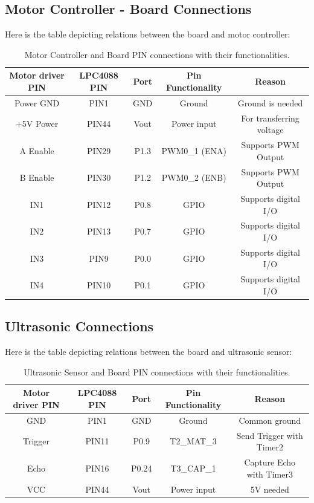 \documentclass[12pt]{article}
\begin{document}
\subsection{Motor Controller - Board Connections}

Here is the table depicting relations between the board and motor controller:

\begin {table}[H]
\begin{center}
\begin{tabular}{|c|c|c|c|c|}
\hline
Motor driver PIN & LPC4088 PIN & Port & Pin Functionality & Reason \\\hline
Power GND & PIN1 & GND & Ground & Ground is needed \\\hline
+5V Power & PIN44 & Vout & Power input & For transferring voltage \\\hline
A Enable & PIN29 & P1.3 & PWM0\_1 (ENA) & Supports PWM Output \\\hline
B Enable & PIN30 & P1.2 & PWM0\_2 (ENB) & Supports PWM Output \\\hline
IN1 & PIN12 & P0.8 & GPIO & Supports digital I/O \\\hline
IN2 & PIN13 & P0.7 & GPIO & Supports digital I/O \\\hline
IN3 & PIN9 & P0.0 & GPIO & Supports digital I/O \\\hline
IN4 & PIN10 & P0.1 & GPIO & Supports digital I/O \\\hline
\end{tabular}
\caption{Motor Controller and Board PIN connections with their functionalities.}
\end{center}
\end{table}


\subsection{Ultrasonic Connections}

Here is the table depicting relations between the board and ultrasonic sensor:

\begin {table}[H]
\begin{center}
\begin{tabular}{|c|c|c|c|c|}
\hline
Motor driver PIN & LPC4088 PIN & Port & Pin Functionality & Reason \\\hline
GND & PIN1 & GND & Ground & Common ground \\\hline
Trigger & PIN11 & P0.9 & T2\_MAT\_3 & Send Trigger with Timer2\\\hline
Echo & PIN16 & P0.24 & T3\_CAP\_1 & Capture Echo with Timer3 \\\hline
VCC & PIN44 & Vout & Power input & 5V needed \\\hline
\end{tabular}
\caption{Ultrasonic Sensor and Board PIN connections with their functionalities.}
\end{center}
\end{table}
\end{document}
